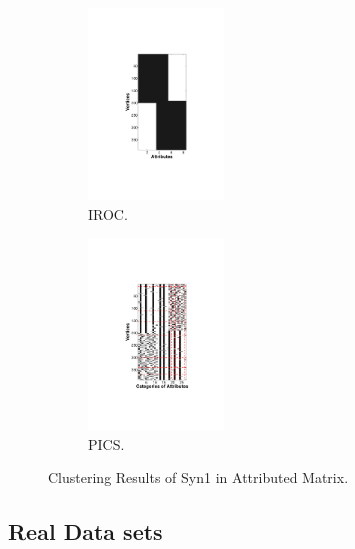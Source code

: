 \begin{figure}	
	\centering
	\begin{subfigure}[h]{1.5in}
		\centering
		\includegraphics[height=2in]{figure/featurestander.pdf}
		\caption{IROC.}\label{fig:IROCsyn}		
	\end{subfigure}
	\quad
	\begin{subfigure}[h]{1.5in}
		\centering
		\includegraphics[height=2in]{figure/featurepics.pdf}
		\caption{PICS.}\label{fig:picssyn}
	\end{subfigure}
	\caption{Clustering Results of Syn1 in Attributed Matrix.}
	\label{fig:subspace}
\end{figure}


\subsection{Real Data sets}
